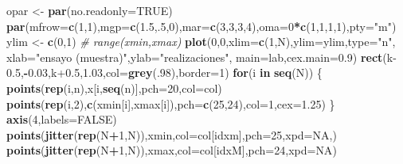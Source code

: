 \documentclass[]{book}
\newenvironment{Shaded}{\begin{snugshade}}{\end{snugshade}}
\newcommand{\CommentTok}[1]{\textcolor[rgb]{0.56,0.35,0.01}{\textit{#1}}}
\newcommand{\ControlFlowTok}[1]{\textcolor[rgb]{0.13,0.29,0.53}{\textbf{#1}}}
\newcommand{\DataTypeTok}[1]{\textcolor[rgb]{0.13,0.29,0.53}{#1}}
\newcommand{\DecValTok}[1]{\textcolor[rgb]{0.00,0.00,0.81}{#1}}
\newcommand{\FloatTok}[1]{\textcolor[rgb]{0.00,0.00,0.81}{#1}}
\newcommand{\KeywordTok}[1]{\textcolor[rgb]{0.13,0.29,0.53}{\textbf{#1}}}
\newcommand{\NormalTok}[1]{#1}
\newcommand{\OperatorTok}[1]{\textcolor[rgb]{0.81,0.36,0.00}{\textbf{#1}}}
\newcommand{\OtherTok}[1]{\textcolor[rgb]{0.56,0.35,0.01}{#1}}
\newcommand{\StringTok}[1]{\textcolor[rgb]{0.31,0.60,0.02}{#1}}
\begin{document}
\begin{Shaded}
\begin{Highlighting}[]
\NormalTok{opar <-}\StringTok{ }\KeywordTok{par}\NormalTok{(}\DataTypeTok{no.readonly=}\OtherTok{TRUE}\NormalTok{)}
\KeywordTok{par}\NormalTok{(}\DataTypeTok{mfrow=}\KeywordTok{c}\NormalTok{(}\DecValTok{1}\NormalTok{,}\DecValTok{1}\NormalTok{),}\DataTypeTok{mgp=}\KeywordTok{c}\NormalTok{(}\FloatTok{1.5}\NormalTok{,.}\DecValTok{5}\NormalTok{,}\DecValTok{0}\NormalTok{),}\DataTypeTok{mar=}\KeywordTok{c}\NormalTok{(}\DecValTok{3}\NormalTok{,}\DecValTok{3}\NormalTok{,}\DecValTok{3}\NormalTok{,}\DecValTok{4}\NormalTok{),}\DataTypeTok{oma=}\DecValTok{0}\OperatorTok{*}\KeywordTok{c}\NormalTok{(}\DecValTok{1}\NormalTok{,}\DecValTok{1}\NormalTok{,}\DecValTok{1}\NormalTok{,}\DecValTok{1}\NormalTok{),}\DataTypeTok{pty=}\StringTok{"m"}\NormalTok{)}
\NormalTok{ylim <-}\StringTok{ }\KeywordTok{c}\NormalTok{(}\DecValTok{0}\NormalTok{,}\DecValTok{1}\NormalTok{)  }\CommentTok{# range(xmin,xmax)}
\KeywordTok{plot}\NormalTok{(}\DecValTok{0}\NormalTok{,}\DecValTok{0}\NormalTok{,}\DataTypeTok{xlim=}\KeywordTok{c}\NormalTok{(}\DecValTok{1}\NormalTok{,N),}\DataTypeTok{ylim=}\NormalTok{ylim,}\DataTypeTok{type=}\StringTok{"n"}\NormalTok{,}
    \DataTypeTok{xlab=}\StringTok{"ensayo (muestra)"}\NormalTok{,}\DataTypeTok{ylab=}\StringTok{"realizaciones"}\NormalTok{,}
    \DataTypeTok{main=}\NormalTok{lab,}\DataTypeTok{cex.main=}\FloatTok{0.9}\NormalTok{)}
\KeywordTok{rect}\NormalTok{(k}\FloatTok{-0.5}\NormalTok{,}\OperatorTok{-}\FloatTok{0.03}\NormalTok{,k}\FloatTok{+0.5}\NormalTok{,}\FloatTok{1.03}\NormalTok{,}\DataTypeTok{col=}\KeywordTok{grey}\NormalTok{(.}\DecValTok{98}\NormalTok{),}\DataTypeTok{border=}\DecValTok{1}\NormalTok{)}
\ControlFlowTok{for}\NormalTok{(i }\ControlFlowTok{in} \KeywordTok{seq}\NormalTok{(N)) \{}
    \KeywordTok{points}\NormalTok{(}\KeywordTok{rep}\NormalTok{(i,n),x[i,}\KeywordTok{seq}\NormalTok{(n)],}\DataTypeTok{pch=}\DecValTok{20}\NormalTok{,}\DataTypeTok{col=}\NormalTok{col)}
    \KeywordTok{points}\NormalTok{(}\KeywordTok{rep}\NormalTok{(i,}\DecValTok{2}\NormalTok{),}\KeywordTok{c}\NormalTok{(xmin[i],xmax[i]),}\DataTypeTok{pch=}\KeywordTok{c}\NormalTok{(}\DecValTok{25}\NormalTok{,}\DecValTok{24}\NormalTok{),}\DataTypeTok{col=}\DecValTok{1}\NormalTok{,}\DataTypeTok{cex=}\FloatTok{1.25}\NormalTok{)}
\NormalTok{\}}
\KeywordTok{axis}\NormalTok{(}\DecValTok{4}\NormalTok{,}\DataTypeTok{labels=}\OtherTok{FALSE}\NormalTok{)}
\KeywordTok{points}\NormalTok{(}\KeywordTok{jitter}\NormalTok{(}\KeywordTok{rep}\NormalTok{(N}\OperatorTok{+}\DecValTok{1}\NormalTok{,N)),xmin,}\DataTypeTok{col=}\NormalTok{col[idxm],}\DataTypeTok{pch=}\DecValTok{25}\NormalTok{,}\DataTypeTok{xpd=}\OtherTok{NA}\NormalTok{,)}
\KeywordTok{points}\NormalTok{(}\KeywordTok{jitter}\NormalTok{(}\KeywordTok{rep}\NormalTok{(N}\OperatorTok{+}\DecValTok{1}\NormalTok{,N)),xmax,}\DataTypeTok{col=}\NormalTok{col[idxM],}\DataTypeTok{pch=}\DecValTok{24}\NormalTok{,}\DataTypeTok{xpd=}\OtherTok{NA}\NormalTok{)}
\end{Highlighting}
\end{Shaded}
\end{document}
